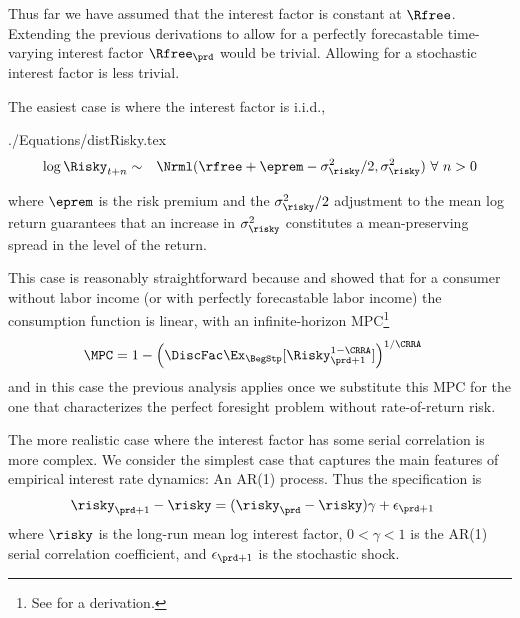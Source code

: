 \documentclass[\econtexRoot/SolvingMicroDSOPs]{subfiles}
\begin{document}
Thus far we have assumed that the interest factor is constant at $\Rfree$.  Extending the
previous derivations to allow for a perfectly forecastable time-varying interest factor $\Rfree_{\prd}$
would be trivial.  Allowing for a stochastic interest factor is less trivial.


The easiest case is where the interest factor is i.i.d.,
\begin{verbatimwrite}{./Equations/distRisky.tex}
  \begin{equation}\begin{gathered}\begin{aligned}
        \log \Risky_{t+n} & \sim & \Nrml(\rfree + \eprem - \sigma^{2}_{\risky}/2,\sigma^{2}_{\risky}) ~\forall~n>0 \label{eq:distRisky}
      \end{aligned}\end{gathered}\end{equation}
\end{verbatimwrite}
\unskip
where $\eprem$ is the risk premium and the $\sigma^{2}_{\risky}/2$ adjustment to the mean log return
guarantees that an increase in $\sigma^{2}_{\risky}$ constitutes a mean-preserving spread in the level of the return.

This case is reasonably straightforward because \cite{merton:restat} and \cite{samuelson:portfolio} showed
that for a consumer without labor income (or with perfectly forecastable labor income) the consumption
function is linear, with an infinite-horizon MPC\footnote{See  for a derivation.}
\begin{equation}\begin{gathered}\begin{aligned}
      \MPC  & = 1- \left(\DiscFac  \Ex_{\BegStp}[\Risky_{\prd+1}^{1-\CRRA}]\right)^{1/\CRRA} \label{eq:MPCExact}
    \end{aligned}\end{gathered}\end{equation}
and in this case the previous analysis applies once we substitute this MPC for the one that characterizes
the perfect foresight problem without rate-of-return risk.

The more realistic case where the interest factor has some serial correlation is more complex.  We consider
the simplest case that captures the main features of empirical interest rate dynamics: An AR(1) process.  Thus
the specification is
\begin{equation}\begin{gathered}\begin{aligned}
      \risky_{\prd+1}-\risky  & = (\risky_{\prd}-\risky) \gamma + \epsilon_{\prd+1}
    \end{aligned}\end{gathered}\end{equation}
where $\risky$ is the long-run mean log interest factor, $0 < \gamma < 1$ is the AR(1) serial correlation
coefficient, and $\epsilon_{\prd+1}$ is the stochastic shock.
\end{document}
